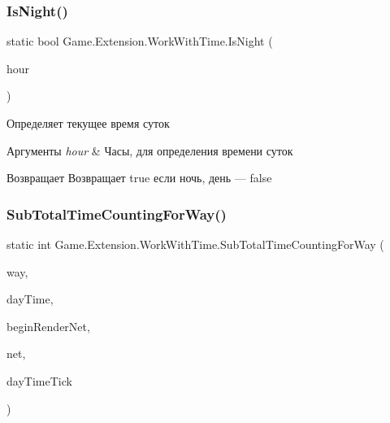 \subsubsection{\texorpdfstring{Is\+Night()}{IsNight()}}
{\footnotesize\ttfamily static bool Game.\+Extension.\+Work\+With\+Time.\+Is\+Night (\begin{DoxyParamCaption}\item[{int}]{hour }\end{DoxyParamCaption})\hspace{0.3cm}{\ttfamily [static]}}



Определяет текущее время суток 


\begin{DoxyParams}{Аргументы}
{\em hour} & Часы, для определения времени суток\\
\hline
\end{DoxyParams}
\begin{DoxyReturn}{Возвращает}
Возвращает true если ночь, день — false
\end{DoxyReturn}
\mbox{\label{class_game_1_1_extension_1_1_work_with_time_ae37335d8f0245588bd981bd71308a6b6}} 
\subsubsection{\texorpdfstring{Sub\+Total\+Time\+Counting\+For\+Way()}{SubTotalTimeCountingForWay()}}
{\footnotesize\ttfamily static int Game.\+Extension.\+Work\+With\+Time.\+Sub\+Total\+Time\+Counting\+For\+Way (\begin{DoxyParamCaption}\item[{List$<$ Point $>$}]{way,  }\item[{Date\+Time}]{day\+Time,  }\item[{Point}]{begin\+Render\+Net,  }\item[{\hyperlink{class_game_1_1_models_1_1_net}{Net}}]{net,  }\item[{int}]{day\+Time\+Tick }\end{DoxyParamCaption})\hspace{0.3cm}{\ttfamily [static]}}




